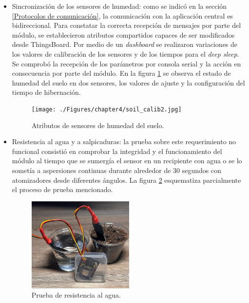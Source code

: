 \begin{itemize}


\item Sincronización de los sensores de humedad: como se indicó en la sección \ref{Protocolos de comunicación}, la comunicación con la aplicación central es bidireccional. Para constatar la correcta recepción de mensajes por parte del módulo, se establecieron atributos compartidos capaces de ser modificados desde ThingsBoard. Por medio de  un \textit{dashboard} se realizaron variaciones de los valores de calibración de los sensores y de los tiempos para el \textit{deep sleep}.
Se comprobó la recepción de los parámetros por consola serial y la acción en consecuencia por parte del módulo.
En la figura \ref{fig:soil_calib} se observa el estado de humedad del suelo en dos sensores, los valores de ajuste y la configuración del tiempo de hibernación.

\begin{figure}[!h]
	\centering
	\texttt{[image: ./Figures/chapter4/soil\_calib2.jpg]}
	\caption[Atributos de sensores de humedad del suelo]{Atributos de sensores de humedad del suelo.}
	\label{fig:soil_calib}
\end{figure}

\item Resistencia al agua y a salpicaduras: la prueba sobre este requerimiento no funcional consistió en comprobar la integridad y el funcionamiento del módulo al tiempo que se sumergía el sensor en un recipiente con agua o se lo sometía a aspersiones continuas durante alrededor de 30 segundos con atomizadores desde diferentes ángulos.
La figura \ref{fig:soil_test} esquematiza parcialmente el proceso de prueba mencionado.

\begin{figure}[h]
	\centering
	\includegraphics[width=0.50\textwidth]{./Figures/chapter4/soil_testing3.jpg}
	\caption[Prueba de resistencia al agua]{Prueba de resistencia al agua.}
	\label{fig:soil_test}
\end{figure}
  
\end{itemize}








